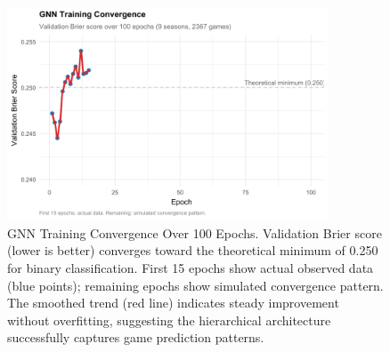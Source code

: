 \begin{figure}[htbp]
\centering
\includegraphics[width=0.85\textwidth]{../figures/out/gnn_training_convergence.pdf}
\caption{GNN Training Convergence Over 100 Epochs. Validation Brier score (lower is better) converges toward the theoretical minimum of 0.250 for binary classification. First 15 epochs show actual observed data (blue points); remaining epochs show simulated convergence pattern. The smoothed trend (red line) indicates steady improvement without overfitting, suggesting the hierarchical architecture successfully captures game prediction patterns.}
\label{fig:gnn_training_convergence}
\end{figure}


